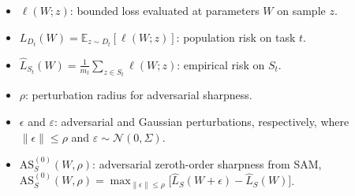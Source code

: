 \documentclass{article}
\begin{document}
\begin{itemize}
\item $\ell(W;z)$: bounded loss evaluated at parameters $W$ on sample $z$.
\item $L_{D_t}(W)=\mathbb E_{z\sim D_t}[\ell(W;z)]$: population risk on task $t$. 
\item $\widehat L_{S_t}(W)=\frac{1}{m_t}\sum_{z\in S_t}\ell(W;z)$: empirical risk on $S_t$.




\item $\rho$: perturbation radius for adversarial sharpness.

\item $\epsilon$ and $\varepsilon$: adversarial and Gaussian perturbations, respectively, where $\|\epsilon\|\le \rho$ and $\varepsilon\sim\mathcal N(0,\Sigma)$.

\item $\mathrm{AS}^{(0)}_S(W,\rho)$: adversarial zeroth-order sharpness from SAM,
$\mathrm{AS}^{(0)}_S(W,\rho)=\max_{\|\epsilon\|\le\rho}\big[\widehat L_S(W+\epsilon)-\widehat L_S(W)\big]$.


\end{itemize}
\end{document}
